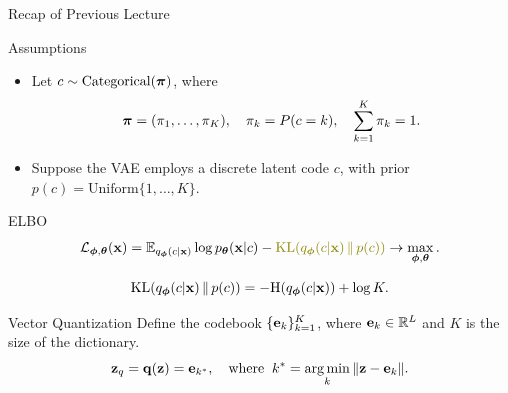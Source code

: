 \documentclass{beamer}
\begin{document}
\begin{frame}
	\titlepage
	\resetonslide
\end{frame}
\begin{frame}{Recap of Previous Lecture}
	\begin{block}{Assumptions}
		\begin{itemize}
			\item Let $c \sim \mathrm{Categorical}(\boldsymbol{\pi})$, where 
			\vspace{-0.6cm}
			\[
				\boldsymbol{\pi} = (\pi_1, \dots, \pi_K), \quad \pi_k = P(c = k), \quad \sum_{k=1}^K \pi_k = 1.
			\]
			\vspace{-0.7cm}
			\item Suppose the VAE employs a discrete latent code $c$, with prior $p(c) = \text{Uniform}\{1, \dots, K\}$.
		\end{itemize}
	\end{block}
	\vspace{-0.3cm}
	\begin{block}{ELBO}
		\vspace{-0.7cm}
		\[
			\cL_{\bphi, \btheta}(\bx)  = \bbE_{q_{\bphi}(c| \bx)} \log \pt(\bx| c) - {\color{olive} \KL(q_{\bphi}(c| \bx) \,\|\, p(c))} \rightarrow \max_{\bphi, \btheta}.
		\]
	\end{block}
	\vspace{-1.0cm}
	\[
		\mathrm{KL}(q_{\boldsymbol{\phi}}(c| \mathbf{x}) \,\|\, p(c)) = - \mathrm{H}(q_{\boldsymbol{\phi}}(c| \mathbf{x})) + \log K. 
	\]		
	\vspace{-0.5cm}
	\begin{block}{Vector Quantization}
		Define the codebook $\{\mathbf{e}_k\}_{k=1}^K$, where $\mathbf{e}_k \in \mathbb{R}^L$ and $K$ is the size of the dictionary.
		\vspace{-0.3cm}
		\[
			\mathbf{z}_q = \mathbf{q} (\mathbf{z}) = \mathbf{e}_{k^*}, \quad \text{where}\;\; k^* = \operatorname*{arg\,min}_k \| \mathbf{z} - \mathbf{e}_k \|.
		\] 
		\vspace{-0.7cm}
	\end{block}
\end{frame}
\end{document}
